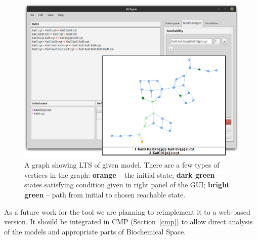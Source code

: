 \documentclass[12pt]{fithesis2}
\begin{document}
\begin{figure}[!h]
\begin{center}
\includegraphics[scale=0.35]{pics/BCSgen_reach}
\caption{A graph showing LTS of given model. There are a few types of vertices in the graph: \textbf{orange} -- the initial state; \textbf{dark green} -- states satisfying condition given in right panel of the GUI; \textbf{bright green} -- path from initial to chosen reachable state.}\label{gui_reach}
\end{center}
\end{figure}

\vspace*{-0.5cm}As a future work for the tool we are planning to reimplement it to a web-based version. It should be integrated in CMP (Section~\ref{cmp}) to allow direct analysis of the models and appropriate parts of Biochemical Space. 




\end{document}
